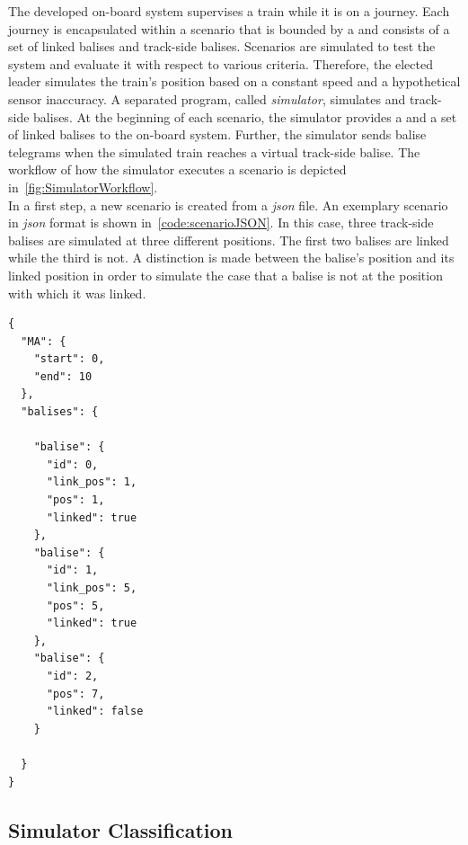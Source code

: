 The developed on-board system supervises a train while it is on a journey.
Each journey is encapsulated within a scenario that is bounded by a  and consists of a set of linked balises and track-side balises.
Scenarios are simulated to test the system and evaluate it with respect to various criteria.
Therefore, the elected leader simulates the train's position based on a constant speed and a hypothetical sensor inaccuracy.
A separated program, called \textit{simulator}, simulates  and track-side balises.
At the beginning of each scenario, the simulator provides a  and a set of linked balises to the on-board system.
Further, the simulator sends balise telegrams when the simulated train reaches a virtual track-side balise.
The workflow of how the simulator executes a scenario is depicted in~\autoref{fig:SimulatorWorkflow}.
\\

In a first step, a new scenario is created from a \textit{json} file.
An exemplary scenario in \textit{json} format is shown in~\autoref{code:scenarioJSON}.
In this case, three track-side balises are simulated at three different positions.
The first two balises are linked while the third is not.
A distinction is made between the balise's position and its linked position in order to simulate the case that a balise is not at the position with which it was linked.


\begin{lstlisting}[caption={The used simulator simulates scenarios that are provided in \texttt{JSON} format. Each scenario consists of a \abr{MA} with a start and an end position, as well as a set of balises. Balises can either be linked or not and include an identification number, a linking position, and a position. The linking position is used to simulate a misplaced balise.}, label=code:scenarioJSON]
{
  "MA": {
    "start": 0,
    "end": 10
  },
  "balises": {

    "balise": {
      "id": 0,
      "link_pos": 1,
      "pos": 1,
      "linked": true
    },
    "balise": {
      "id": 1,
      "link_pos": 5,
      "pos": 5,
      "linked": true
    },
    "balise": {
      "id": 2,
      "pos": 7,
      "linked": false
    }

  }
}

\end{lstlisting}
\subsection{Simulator Classification}

